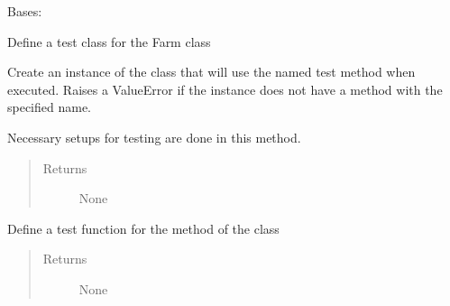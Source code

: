 \documentclass[letterpaper,10pt,english]{sphinxmanual}
\begin{document}
\begin{fulllineitems}
\label{\detokenize{farming:farming.part3_fertilizer.TestFarm}}
\sphinxAtStartPar
Bases: 

\sphinxAtStartPar
Define a test class for the Farm class

\sphinxAtStartPar
Create an instance of the class that will use the named test
method when executed. Raises a ValueError if the instance does
not have a method with the specified name.

\begin{fulllineitems}
\label{\detokenize{farming:farming.part3_fertilizer.TestFarm.setUp}}
\sphinxAtStartPar
Necessary setups for testing are done in this method.
\begin{quote}\begin{description}
\item[{Returns}] \leavevmode
\sphinxAtStartPar
None

\end{description}\end{quote}

\end{fulllineitems}


\begin{fulllineitems}
\label{\detokenize{farming:farming.part3_fertilizer.TestFarm.test_calculate_food_production}}
\sphinxAtStartPar
Define a test function for the  
method of the {\hyperref[\detokenize{farming:farming.part3_fertilizer.Farm}]{}} class
\begin{quote}\begin{description}
\item[{Returns}] \leavevmode
\sphinxAtStartPar
None

\end{description}\end{quote}

\end{fulllineitems}


\end{fulllineitems}
\end{document}
